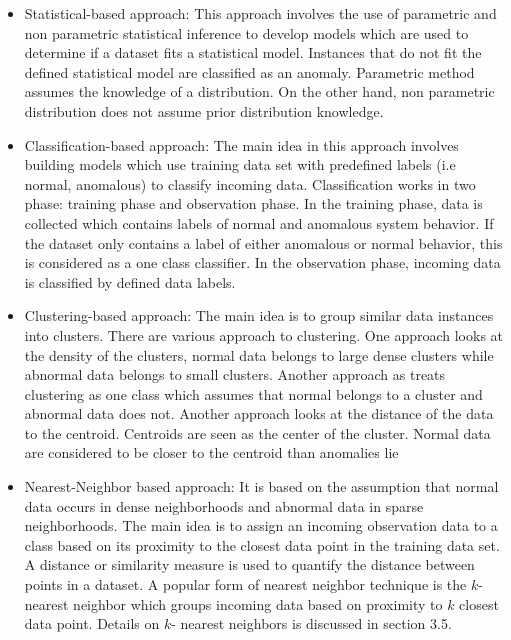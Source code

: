 \begin{itemize}[noitemsep,wide=0pt, leftmargin=\dimexpr{} + 2\relax]


\item Statistical-based approach: This approach involves the use of parametric and non parametric statistical inference to develop models which are used to determine if a dataset fits a statistical model. Instances that do not fit the defined statistical model are classified as an anomaly. Parametric method assumes the knowledge of a distribution. On the other hand, non parametric distribution does not assume prior distribution knowledge. 

\item Classification-based approach: The main idea in this approach involves building models which use training data set with predefined labels (i.e normal, anomalous) to classify incoming data. Classification works in two phase: training phase and observation phase. In the training phase, data is collected which contains labels of normal and anomalous system behavior. If the dataset only contains a label of either anomalous or normal behavior, this is considered as a one class classifier. In the observation phase, incoming data is classified by defined data labels.

\item Clustering-based approach: The main idea is to group similar data instances into clusters. There are various approach to clustering. One approach looks at the density of the clusters, normal data belongs to large dense clusters while abnormal data belongs to small clusters. Another approach as treats clustering as one class which assumes that normal belongs to a cluster and abnormal data does not. Another approach looks at the distance of the data to the centroid. Centroids are seen as the center of the cluster. Normal data are  considered to be closer to the centroid than anomalies lie


\item Nearest-Neighbor based approach: It is based on the assumption that normal data occurs in dense neighborhoods and abnormal data in sparse neighborhoods. The main idea is to assign an incoming observation data to a class based on its proximity to the closest data point in the training data set. A distance or similarity measure is used to quantify the distance between points in a dataset.  A popular form of nearest neighbor technique is the $k$-nearest neighbor which groups incoming data based on proximity to $k$ closest data point. Details on $k$- nearest neighbors is discussed in section 3.5. 


\end{itemize}
